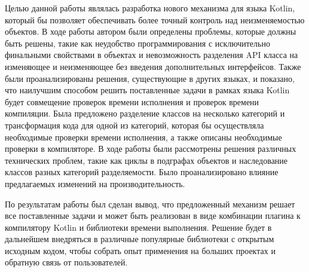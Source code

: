\documentclass[specification,annotation,times]{itmo-student-thesis}
\begin{document}
\startconclusionpage

Целью данной работы являлась разработка нового механизма для языка Kotlin, который бы позволяет обеспечивать более точный контроль над неизменяемостью объектов.
В ходе работы автором были определены проблемы, которые должны быть решены, такие как неудобство программирования с исключительно финальными свойствами в объектах и невозможность разделения API класса на изменяющее и неизменяющее без введения дополнительных интерфейсов.
Также были проанализированы решения, существующие в других языках, и показано, что наилучшим способом решить поставленные задачи в рамках языка Kotlin будет совмещение проверок времени исполнения и проверок времени компиляции.
Была предложено разделение классов на несколько категорий и трансформация кода для одной из категорий, которая бы осуществляла необходимые проверки времени исполнения, а также описаны необходимые проверки в компиляторе.
В ходе работы были рассмотрены решения различных технических проблем, такие как циклы в подграфах объектов и наследование классов разных категорий разделяемости. Было проанализировано влияние предлагаемых изменений на производительность.

По результатам работы был сделан вывод, что предложенный механизм решает все поставленные задачи и может быть реализован в виде комбинации плагина к компилятору Kotlin и библиотеки времени выполнения.
Решение будет в дальнейшем внедряться в различные популярные библиотеки с открытым исходным кодом, чтобы собрать опыт применения на больших проектах и обратную связь от пользователей.


\printmainbibliography


\end{document}
